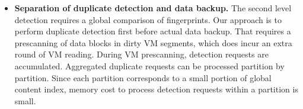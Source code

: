 \begin{itemize}


\item {\bf Separation of duplicate detection and data backup.}
The second level detection requires a global comparison of fingerprints.
Our approach is to perform duplicate detection first before actual data backup.
That requires a prescanning of  data  blocks in dirty VM segments, which
does incur an extra  round of VM reading.
During VM prescanning, detection requests are accumulated.
Aggregated duplicate requests can be processed partition by partition. 
Since each partition corresponds to a small portion of global content index, 
memory cost to process detection requests within a partition is small.


\end{itemize}
